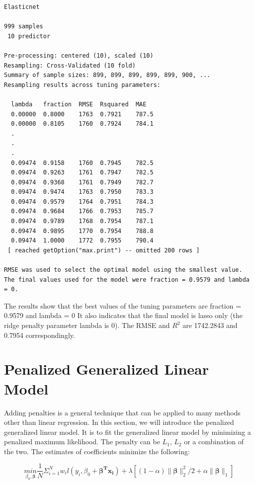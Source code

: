 \documentclass[12pt,]{krantz}
\begin{document}
\begin{verbatim}
Elasticnet 

999 samples
 10 predictor

Pre-processing: centered (10), scaled (10) 
Resampling: Cross-Validated (10 fold) 
Summary of sample sizes: 899, 899, 899, 899, 899, 900, ... 
Resampling results across tuning parameters:

  lambda   fraction  RMSE  Rsquared  MAE  
  0.00000  0.8000    1763  0.7921    787.5
  0.00000  0.8105    1760  0.7924    784.1
  .
  .
  .
  0.09474  0.9158    1760  0.7945    782.5
  0.09474  0.9263    1761  0.7947    782.5
  0.09474  0.9368    1761  0.7949    782.7
  0.09474  0.9474    1763  0.7950    783.3
  0.09474  0.9579    1764  0.7951    784.3
  0.09474  0.9684    1766  0.7953    785.7
  0.09474  0.9789    1768  0.7954    787.1
  0.09474  0.9895    1770  0.7954    788.8
  0.09474  1.0000    1772  0.7955    790.4
 [ reached getOption("max.print") -- omitted 200 rows ]

RMSE was used to select the optimal model using the smallest value.
The final values used for the model were fraction = 0.9579 and lambda = 0.
\end{verbatim}

The results show that the best values of the tuning parameters are fraction = 0.9579 and lambda = 0 It also indicates that the final model is lasso only (the ridge penalty parameter lambda is 0). The RMSE and \(R^{2}\) are 1742.2843 and 0.7954 correspondingly.

\hypertarget{penalized-generalized-linear-model}{%
\section{Penalized Generalized Linear Model}\label{penalized-generalized-linear-model}}

Adding penalties is a general technique that can be applied to many methods other than linear regression. In this section, we will introduce the penalized generalized linear model. It is to fit the generalized linear model by minimizing a penalized maximum likelihood. The penalty can be \(L_1\), \(L_2\) or a combination of the two. The estimates of coefficients minimize the following:

\[\underset{\beta_{0},\symbf{\beta}}{min}\frac{1}{N}\Sigma_{i=1}^{N}w_{i}l(y_{i},\beta_{0}+\symbf{\beta^{T}x_{i}})+\lambda[(1-\alpha)\parallel\symbf{\beta}\parallel_{2}^{2}/2+\alpha\parallel\symbf{\beta}\parallel_{1}]\]
\end{document}
